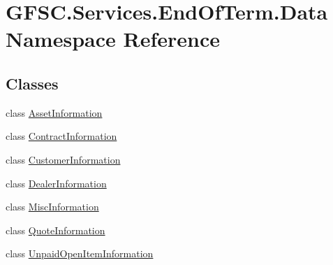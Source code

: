 \hypertarget{namespace_g_f_s_c_1_1_services_1_1_end_of_term_1_1_data}{}\section{G\+F\+S\+C.\+Services.\+End\+Of\+Term.\+Data Namespace Reference}
\label{namespace_g_f_s_c_1_1_services_1_1_end_of_term_1_1_data}
\subsection*{Classes}
\begin{DoxyCompactItemize}
\item 
class \mbox{\hyperlink{class_g_f_s_c_1_1_services_1_1_end_of_term_1_1_data_1_1_asset_information}{Asset\+Information}}
\item 
class \mbox{\hyperlink{class_g_f_s_c_1_1_services_1_1_end_of_term_1_1_data_1_1_contract_information}{Contract\+Information}}
\item 
class \mbox{\hyperlink{class_g_f_s_c_1_1_services_1_1_end_of_term_1_1_data_1_1_customer_information}{Customer\+Information}}
\item 
class \mbox{\hyperlink{class_g_f_s_c_1_1_services_1_1_end_of_term_1_1_data_1_1_dealer_information}{Dealer\+Information}}
\item 
class \mbox{\hyperlink{class_g_f_s_c_1_1_services_1_1_end_of_term_1_1_data_1_1_misc_information}{Misc\+Information}}
\item 
class \mbox{\hyperlink{class_g_f_s_c_1_1_services_1_1_end_of_term_1_1_data_1_1_quote_information}{Quote\+Information}}
\item 
class \mbox{\hyperlink{class_g_f_s_c_1_1_services_1_1_end_of_term_1_1_data_1_1_unpaid_open_item_information}{Unpaid\+Open\+Item\+Information}}
\end{DoxyCompactItemize}
